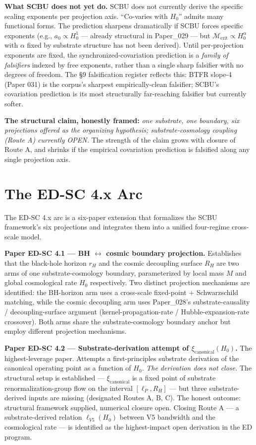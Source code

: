 \documentclass[11pt,a4paper]{article}
\begin{document}
\textbf{What SCBU does not yet do.} SCBU does not currently derive the specific scaling exponents per projection axis. ``Co-varies with $H_0$'' admits many functional forms. The prediction sharpens dramatically if SCBU forces specific exponents (e.g., $a_0 \propto H_0^1$ --- already structural in Paper\_029 --- but $\mathcal{M}_\mathrm{crit} \propto H_0^\alpha$ with $\alpha$ fixed by substrate structure has not been derived). Until per-projection exponents are fixed, the synchronized-covariation prediction is a \emph{family of falsifiers} indexed by free exponents, rather than a single sharp falsifier with no degrees of freedom. The \S9 falsification register reflects this: BTFR slope-4 (Paper 031) is the corpus's sharpest empirically-clean falsifier; SCBU's covariation prediction is its most structurally far-reaching falsifier but currently softer.

\textbf{The structural claim, honestly framed:} \emph{one substrate, one boundary, six projections offered as the organizing hypothesis; substrate-cosmology coupling (Route A) currently OPEN.} The strength of the claim grows with closure of Route A, and shrinks if the empirical covariation prediction is falsified along any single projection axis.

\section{The ED-SC 4.x Arc}

The ED-SC 4.x arc is a six-paper extension that formalizes the SCBU framework's six projections and integrates them into a unified four-regime cross-scale model.

\textbf{Paper ED-SC 4.1 --- BH $\leftrightarrow$ cosmic boundary projection.} Establishes that the black-hole horizon $r_H$ and the cosmic decoupling surface $R_H$ are two arms of one substrate-cosmology boundary, parameterized by local mass $M$ and global cosmological rate $H_0$ respectively. Two distinct projection mechanisms are identified: the BH-horizon arm uses a cross-scale fixed-point + Schwarzschild matching, while the cosmic decoupling arm uses Paper\_028's substrate-causality / decoupling-surface argument (kernel-propagation-rate / Hubble-expansion-rate crossover). Both arms share the substrate-cosmology boundary anchor but employ different projection mechanisms.

\textbf{Paper ED-SC 4.2 --- Substrate-derivation attempt of $\xi_\mathrm{canonical}(H_0)$.} The highest-leverage paper. Attempts a first-principles substrate derivation of the canonical operating point as a function of $H_0$. \emph{The derivation does not close.} The structural setup is established --- $\xi_\mathrm{canonical}$ is a fixed point of substrate renormalization-group flow on the interval $[\ell_P, R_H]$ --- but three substrate-derived inputs are missing (designated Routes A, B, C). The honest outcome: structural framework supplied, numerical closure open. Closing Route A --- a substrate-derived relation $\ell_{V5}(H_0)$ between V5 bandwidth and the cosmological rate --- is identified as the highest-impact open derivation in the ED program.
\end{document}
